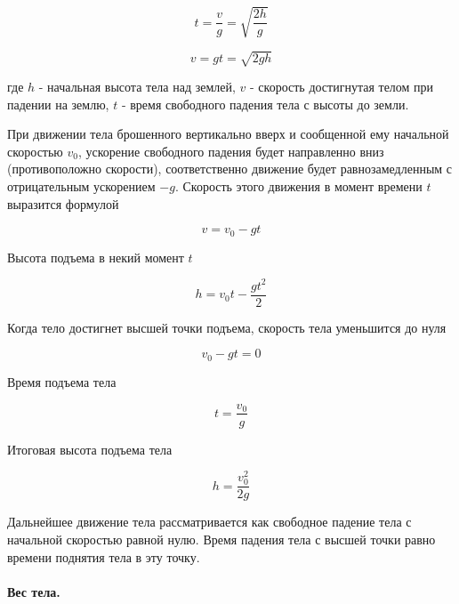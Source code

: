 \documentclass[a4paper,12pt]{article}
\begin{document}
		\begin{equation}
			t = \frac{v}{g} = \sqrt{\frac{2h}{g}}
		\end{equation}

		\begin{equation}
			v = gt = \sqrt{2gh}
		\end{equation}

		где $h$ - начальная высота тела над землей, 
		$v$ - скорость достигнутая телом при падении на землю,
		$t$ - время свободного падения тела с высоты до земли.

		При движении тела брошенного вертикально вверх и сообщенной ему начальной 
		скоростью $v_0$, ускорение свободного падения будет направленно вниз 
		(противоположно скорости), соответственно движение будет равнозамедленным 
		с отрицательным ускорением $-g$. Скорость этого движения в момент времени $t$
		выразится формулой

		\begin{equation}
			v = v_0 - gt
		\end{equation}

		Высота подъема в некий момент $t$

		\begin{equation}
			h = v_0t - \frac{gt^2}{2}
		\end{equation}

		Когда тело достигнет высшей точки подъема, скорость тела уменьшится до нуля

		\begin{equation}
			v_0 - gt = 0
		\end{equation}

		Время подъема тела

		\begin{equation}
			t = \frac{v_0}{g}
		\end{equation}

		Итоговая высота подъема тела

		\begin{equation}
			h = \frac{v_0^2}{2g}
		\end{equation}

		Дальнейшее движение тела рассматривается как свободное падение 
		тела с начальной скоростью равной нулю.
		Время падения тела с высшей точки равно времени поднятия тела
		в эту точку.


		\paragraph{Вес тела.} \
\end{document}
